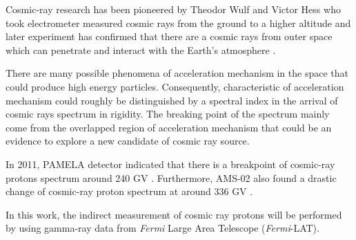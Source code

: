 \par Cosmic-ray research has been pioneered by Theodor Wulf and Victor Hess who took electrometer measured cosmic rays from the ground to a higher altitude and later experiment has confirmed that there are a cosmic rays from outer space which can penetrate and interact with the Earth's atmosphere \cite{HESS,Pacini,Clay}.

\par There are many possible phenomena of acceleration mechanism in the
space that could produce high energy particles. Consequently, characteristic of acceleration mechanism could roughly be distinguished by a spectral index in the arrival of cosmic rays spectrum in rigidity.
The breaking point of the spectrum mainly come from the overlapped region of acceleration mechanism that could be an evidence to explore a new candidate of cosmic ray source.

In 2011, PAMELA detector indicated that there is a breakpoint of cosmic-ray protons spectrum around 240 GV \cite{PAMELA}.
Furthermore, AMS-02 also found a drastic change of cosmic-ray proton spectrum at around 336 GV \cite{AMS-02}.

\par In this work, the indirect measurement of cosmic ray protons will be performed by using gamma-ray data from \textit{Fermi} Large Area Telescope (\textit{Fermi}-LAT).